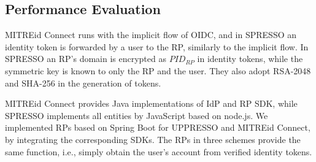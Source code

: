 \subsection{Performance Evaluation}
\label{sec:evaluation}




MITREid Connect runs with the implicit flow of OIDC,
 and in SPRESSO an identity token is forwarded by a user to the RP,
    similarly to the implicit flow. %
In SPRESSO an RP's domain is encrypted as $PID_{RP}$ in identity tokens,
while the symmetric key is known to only the RP and the user.
They also adopt RSA-2048 and SHA-256  in the generation of tokens.


MITREid Connect provides Java implementations of IdP and
RP SDK,
 while SPRESSO implements all entities by JavaScript based on node.js.
We implemented RPs based on Spring Boot for UPPRESSO and MITREid Connect, by integrating the corresponding SDKs.
The RPs in three schemes provide the same function, i.e.,
     simply obtain the user's account from verified identity tokens.

